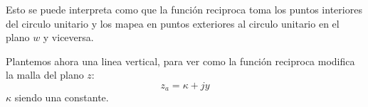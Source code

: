 \begin{figure}[H]
\centering
    \begin{minipage}{0.4\textwidth}
    \centering
       
    \label{fig:InvF1}
    \end{minipage}
    
   \begin{minipage}{0.4\textwidth}
    \centering
       
    \label{fig:InvF2}
    \end{minipage}
    \caption{}
    \label{fig:InvF}
\end{figure}
Esto se puede interpreta como que la función reciproca toma los puntos interiores del circulo unitario y los mapea en puntos exteriores al circulo unitario en el plano $w$ y viceversa.

Plantemos ahora una linea vertical, para ver como la función reciproca modifica la malla del plano $z$:
\begin{equation}
    z_a=\kappa+jy
\end{equation}
$\kappa$ siendo una constante.

